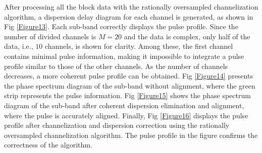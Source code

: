 \documentclass[referee]{raa}
\begin{document}


After processing all the block data with the rationally oversampled channelization algorithm, a dispersion delay diagram for each channel is generated, as shown in Fig \ref{Figure13}. Each sub-band correctly displays the pulse profile. Since the number of divided channels is $M=20$ and the data is complex, only half of the data, i.e., $10$ channels, is shown for clarity. Among these, the first channel contains minimal pulse information, making it impossible to integrate a pulse profile similar to those of the other channels. As the number of channels decreases, a more coherent pulse profile can be obtained. Fig \ref{Figure14} presents the phase spectrum diagram of the sub-band without alignment, where the green strip represents the pulse information. Fig \ref{Figure15} shows the phase spectrum diagram of the sub-band after coherent dispersion elimination and alignment, where the pulse is accurately aligned. Finally, Fig \ref{Figure16} displays the pulse profile after channelization and dispersion correction using the rationally oversampled channelization algorithm. The pulse profile in the figure confirms the correctness of the algorithm.
\end{document}
